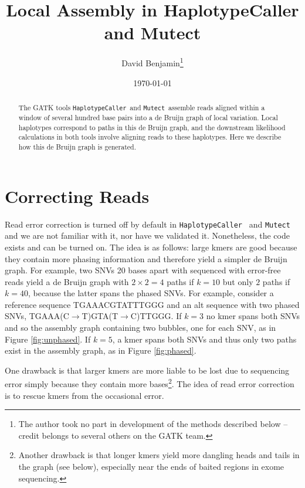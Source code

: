 \documentclass[nofootinbib,amssymb,amsmath]{revtex4}
\newcommand{\HC}{\texttt{HaplotypeCaller}}
\newcommand{\Mutect}{\texttt{Mutect}}
\begin{document}
\title{Local Assembly in HaplotypeCaller and Mutect}
\author{David Benjamin\footnote{The author took no part in development of the methods described below -- credit belongs to several others on the GATK team. }}

\date{\today}

\begin{abstract}
The GATK tools \HC~and \Mutect~assemble reads aligned within a window of several hundred base pairs into a de Bruijn graph of local variation.  Local haplotypes correspond to paths in this de Bruijn graph, and the downstream likelihood calculations in both tools involve aligning reads to these haplotypes.  Here we describe how this de Bruijn graph is generated.
\end{abstract}

\maketitle

\section{Correcting Reads} \label{correcting-reads}
Read error correction is turned off by default in \HC~ and \Mutect~ and we are not familiar with it, nor have we validated it.  Nonetheless, the code exists and can be turned on.  The idea is as follows: large kmers are good because they contain more phasing information and therefore yield a simpler de Bruijn graph.  For example, two SNVs 20 bases apart with sequenced with error-free reads yield a de Bruijn graph with $2 \times 2 = 4$ paths if $k = 10$ but only $2$ paths if $k = 40$, because the latter spans the phased SNVs.  For example, consider a reference sequence TGAAACGTATTTGGG and an alt sequence with two phased SNVs, TGAAA(C$\rightarrow$T)GTA(T$\rightarrow$C)TTGGG.  If $k=3$ no kmer spans both SNVs and so the assembly graph containing two bubbles, one for each SNV, as in Figure \ref{fig:unphased}.  If $k = 5$, a kmer spans both SNVs and thus only two paths exist in the assembly graph, as in Figure \ref{fig:phased}.

One drawback is that larger kmers are more liable to be lost due to sequencing error simply because they contain more bases\footnote{Another drawback is that longer kmers yield more dangling heads and tails in the graph (see below), especially near the ends of baited regions in exome sequencing.}.  The idea of read error correction is to rescue kmers from the occasional error.
\end{document}
